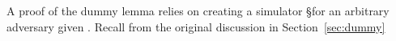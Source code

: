 A proof of the dummy lemma relies on creating a simulator \S for an arbitrary adversary given \DS.
Recall from the original discussion in Section~\ref{sec:dummy}
